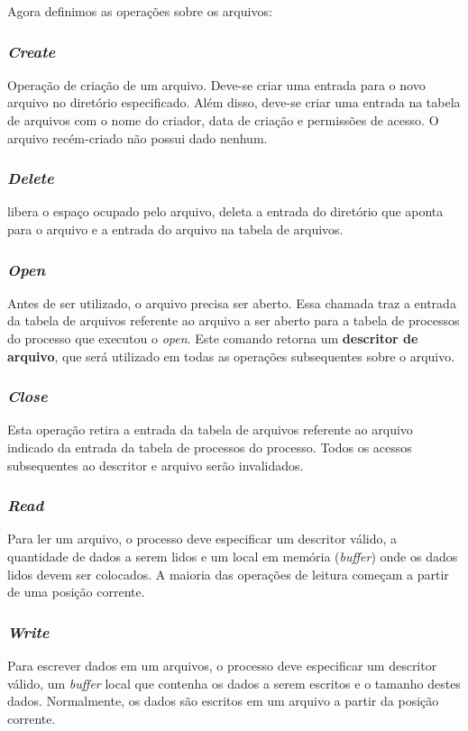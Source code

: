 Agora definimos as operações sobre os arquivos:

\subsubsection{\textit{Create}}
Operação de criação de um arquivo. Deve-se criar uma entrada para o novo arquivo no diretório especificado. Além disso, deve-se criar uma entrada na tabela de arquivos com o nome do criador, data de criação e permissões de acesso. O arquivo recém-criado não possui dado nenhum.


\subsubsection{\textit{Delete}}
libera o espaço ocupado pelo arquivo, deleta a entrada do diretório que aponta para o arquivo e a entrada do arquivo na tabela de arquivos.


\subsubsection{\textit{Open}}
Antes de ser utilizado, o arquivo precisa ser aberto. Essa chamada traz a entrada da tabela de arquivos referente ao arquivo a ser aberto para a tabela de processos do processo que executou o \textit{open}. Este comando retorna um \textbf{descritor de arquivo}, que será utilizado em todas as operações subsequentes sobre o arquivo.


\subsubsection{\textit{Close}}
Esta operação retira a entrada da tabela de arquivos referente ao arquivo indicado da entrada da tabela de processos do processo. Todos os acessos subsequentes ao descritor e arquivo serão invalidados.


\subsubsection{\textit{Read}}
Para ler um arquivo, o processo deve especificar um descritor válido, a quantidade de dados a serem lidos e um local em memória (\textit{buffer}) onde os dados lidos devem ser colocados. A maioria das operações de leitura começam a partir de uma posição corrente.

\subsubsection{\textit{Write}}
Para escrever dados em um arquivos, o processo deve especificar um descritor válido, um \textit{buffer} local que contenha os dados a serem escritos e o tamanho destes dados. Normalmente, os dados são escritos em um arquivo a partir da posição corrente.

